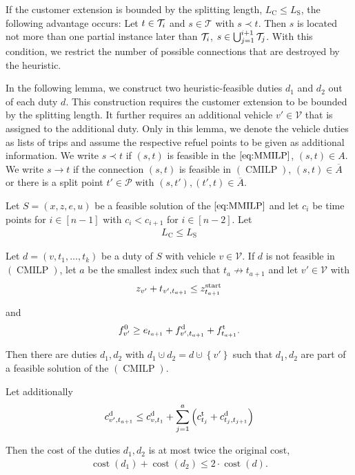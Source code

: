 If the customer extension is bounded by the splitting length, \ie ${L_{\operatorname{C}}\leq L_{\operatorname{S}}}$, the following advantage occurs: Let ${t\in\mathcal{T}_i}$ and ${s\in\mathcal{T}}$ with ${s\prec t}$. Then $s$ is located not more than one partial instance later than $\mathcal{T}_i$, \ie ${s\in\bigcup_{j=1}^{i+1}\mathcal{T}_j}$. With this condition, we restrict the number of possible connections that are destroyed by the heuristic.

In the following lemma, we construct two heuristic-feasible duties $d_1$ and $d_2$ out of each duty $d$. This construction requires the customer extension to be bounded by the splitting length. It further requires an additional vehicle ${v'\in\mathcal{V}}$ that is assigned to the additional duty. Only in this lemma, we denote the vehicle duties as lists of trips and assume the respective refuel points to be given as additional information. We write ${s\prec t}$ if $(s,t)$ is feasible in the $\eqref{eq:MMILP}$, \ie ${(s,t)\in A}$.  We write ${s\to t}$ if the connection $(s,t)$ is feasible in $(\operatorname{CMILP})$, \ie ${(s,t)\in\overline{A}}$ or there is a split point ${t'\in\mathcal{P}}$ with ${(s,t'),(t',t)\in\overline{A}}$.

\begin{lemma}
\label{lem:doubleduties}

Let $S=\left(x,z,e,u\right)$ be a feasible solution of the $\eqref{eq:MMILP}$ and let $c_i$ be time points for $i\in[n-1]$ with ${c_i<c_{i+1}}$ for ${i\in[n-2]}$. Let
\begin{align}
	L_{\operatorname{C}}\leq L_{\operatorname{S}}\label{eq:LCLS}
\end{align}

Let ${d=\left(v,t_1,\dots,t_k\right)}$ be a duty of $S$ with vehicle $v\in\mathcal{V}$. If $d$ is not feasible in $(\operatorname{CMILP})$, let $a$ be the smallest index such that ${t_a\not\to t_{a+1}}$ and let ${v'\in\mathcal{V}}$ with
\begin{align}
	z_{v'} + t_{v',t_{a+1}}\leq z^{\operatorname{start}}_{t_{a+1}}\label{eq:doubleduties:time}
\end{align}

and
\begin{align}
	f^0_{v'}\geq e_{t_{a+1}} + f^{\operatorname{d}}_{v',t_{a+1}} + f^{\operatorname{t}}_{t_{a+1}}.\label{eq:doubleduties:fuel}
\end{align}

Then there are duties $d_1,d_2$ with ${d_1\cupdot d_2=d\cupdot\left\{v'\right\}}$ such that $d_1,d_2$ are part of a feasible solution of the $(\operatorname{CMILP})$.

Let additionally
\begin{align}
	c^{\operatorname{d}}_{v',t_{a+1}}\leq c^{\operatorname{d}}_{v,t_1} + \sum_{j=1}^a \left(c^{\operatorname{t}}_{t_j} + c^{\operatorname{d}}_{t_j,t_{j+1}}\right) \label{eq:doubleduties:cost}
\end{align}

Then the cost of the duties $d_1,d_2$ is at most twice the original cost, \ie
\begin{align*}
	\operatorname{cost}\left(d_1\right) + \operatorname{cost}\left(d_2\right) \leq 2\cdot\operatorname{cost}\left(d\right).
\end{align*}

\end{lemma}

